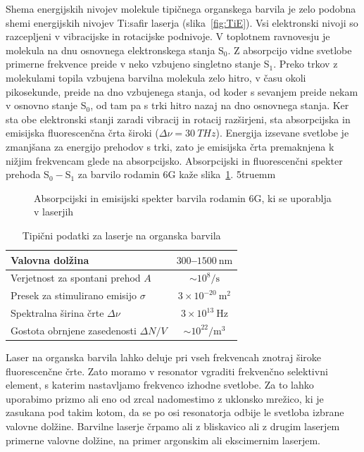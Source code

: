 Shema energijskih nivojev molekule tipičnega organskega barvila
je zelo podobna shemi energijskih nivojev Ti:safir laserja (slika~\ref{fig:TiE}).
Vsi elektronski nivoji so razcepljeni v vibracijske in rotacijske podnivoje. 
V toplotnem ravnovesju je molekula na dnu osnovnega elektronskega stanja S$_0$. 
Z absorpcijo vidne svetlobe primerne frekvence preide v neko vzbujeno
singletno stanje S$_1$. Preko trkov z molekulami topila vzbujena barvilna molekula
zelo hitro, v času okoli pikosekunde, preide na dno vzbujenega stanja, od
koder s sevanjem preide nekam v osnovno stanje S$_0$, od tam pa s trki
hitro nazaj na dno osnovnega stanja. Ker
sta obe elektronski stanji zaradi vibracij in rotacij razširjeni, sta 
absorpcijska in emisijska fluorescenčna črta široki ($\Delta \nu = 30~\si{THz}$).
Energija izsevane svetlobe je zmanjšana za energijo
prehodov s trki, zato je emisijska črta premaknjena k nižjim
frekvencam glede na absorpcijsko. Absorpcijski in fluorescenčni spekter prehoda S$_0-$S$_1$
za barvilo rodamin 6G kaže slika~\ref{fig:RhG}.
\vglue5truemm
\begin{figure}[ht]
\centering
\def\svgwidth{80truemm} 

\caption{Absorpcijski in emisijski spekter barvila rodamin 6G, ki se uporablja v laserjih}
\label{fig:RhG}
\end{figure} 

\begin{table}[ht]
\begin{center}
\begin{tabular}{|l|c|}\hline
Valovna dolžina  & $300$--$1500~\si{\nano\meter}$\\ \hline
Verjetnost za spontani prehod $A$ & $ \sim 10^8/\si{\second}$ \\ \hline
Presek za stimulirano emisijo $\sigma$ & $3 \times 10^{-20}~\si{\metre}^2$ \\ \hline
Spektralna širina črte $\Delta \nu$ & $3 \times 10^{13}~\si{\hertz}$  \\ \hline
Gostota obrnjene zasedenosti $\Delta N/V$ & $ \sim 10^{22}/\si{\metre}^3$ \\ \hline
\end{tabular}
\caption{Tipični podatki za laserje na organska barvila}
\label{tab:orgb}
\end{center}
\end{table}

Laser na organska barvila lahko deluje pri vseh frekvencah znotraj široke
fluorescenčne črte. Zato moramo v resonator vgraditi frekvenčno
selektivni element, s katerim nastavljamo frekvenco izhodne svetlobe. Za to lahko 
uporabimo prizmo ali eno od zrcal nadomestimo 
z uklonsko mrežico, ki je zasukana pod takim kotom, da se po osi resonatorja odbije le svetloba
izbrane valovne dolžine.
Barvilne laserje črpamo ali z bliskavico ali z drugim laserjem primerne 
valovne dolžine, na primer argonskim ali ekscimernim laserjem. 

